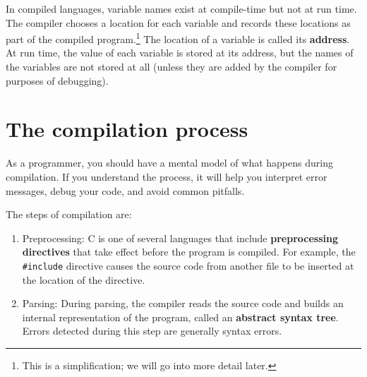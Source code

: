 \documentclass[12pt]{book}
\begin{document}
{In compiled languages, variable names exist at compile-time but not at
run time.  The compiler chooses a location for each variable and
records these locations as part of the compiled program.\footnote{This
  is a simplification; we will go into more detail later.}  The
location of a variable is called its {\bf address}.  At run time, the
value of each variable is stored at its address, but the names of the
variables are not stored at all (unless they are added by the compiler
for purposes of debugging).





\section{The compilation process}

As a programmer, you should have a mental model of what happens
during compilation.  If you understand the process, it will help
you interpret error messages, debug your code, and avoid
common pitfalls.

The steps of compilation are:

\begin{enumerate}

\item Preprocessing: C is one of several languages that include
  {\bf preprocessing directives} that take effect before the program is
  compiled.  For example, the \verb"#include" directive causes the
  source code from another file to be inserted at the location of the
  directive.

\item Parsing: During parsing, the compiler reads the source code and
  builds an internal representation of the program, called an
  {\bf abstract syntax tree}.  Errors
  detected during this step are generally syntax errors.


\end{enumerate}}
\end{document}
